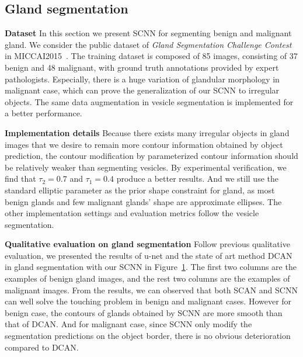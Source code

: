 \subsection{Gland segmentation}
\textbf{Dataset}
In this section we present SCNN for segmenting benign and malignant gland.
We consider the public dataset of \emph{Gland Segmentation Challenge Contest} in MICCAI2015~\cite{Sirinukunwattana2015a}.
%
The training dataset is composed of 85 images, consisting of 37 benign and 48 malignant, with ground truth annotations provided by expert pathologists.
Especially, there is a huge variation of glandular morphology in malignant case, which can prove the generalization of our SCNN to irregular objects.
The same data augmentation in vesicle segmentation is implemented for a better performance.

\textbf{Implementation details}
Because there exists many irregular objects in gland images that we desire to remain more contour information obtained by object prediction, the contour modification by parameterized contour information should be relatively weaker than segmenting vesicles.
By experimental verification, we find that $\tau_2=0.7$ and $\tau_1=0.4 $ produce a better results.
%
And we still use the standard elliptic parameter as the prior shape constraint for gland, as most benign glands and few malignant glands' shape are approximate ellipses.
The other implementation settings and evaluation metrics follow the vesicle segmentation.

\textbf{Qualitative evaluation on gland segmentation}
Follow previous qualitative evaluation, we presented the results of u-net and the state of art method DCAN in gland segmentation with our SCNN in Figure~\ref{fig:com-gland}.
The first two columns are the examples of benign gland images, and the rest two columns are the examples of malignant images.
From the results, we can observed that both SCAN and SCNN can well solve the touching problem in benign and malignant cases.
However for benign case, the contours of glands obtained by SCNN are more smooth than that of DCAN.
And for malignant case, since SCNN only modify the segmentation predictions on the object border, there is no obvious deterioration compared to DCAN.

\begin{figure}
	\centering
	\vspace{0.4in}
	\caption{}
	\label{fig:com-gland}
\end{figure}

